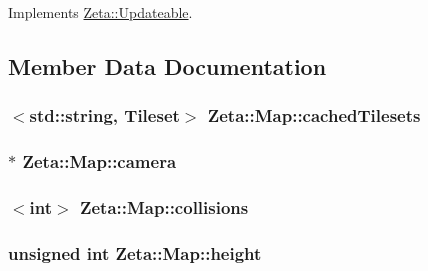 Implements \hyperlink{classZeta_1_1Updateable_af4006bfccb762454b4da08786ad93de0}{Zeta\+::\+Updateable}.



\subsection{Member Data Documentation}
\hypertarget{classZeta_1_1Map_aa4510662d56f1daac52bf382de75ad99}{
\subsubsection[{cached\+Tilesets}]{$<$std\+::string, {\bf Tileset}$>$ Zeta\+::\+Map\+::cached\+Tilesets\hspace{0.3cm}{\ttfamily [protected]}}}\label{classZeta_1_1Map_aa4510662d56f1daac52bf382de75ad99}
\hypertarget{classZeta_1_1Map_a9b9106c7c9476767a019f2a0a6a6e29b}{
\subsubsection[{camera}]{$\ast$ Zeta\+::\+Map\+::camera\hspace{0.3cm}{\ttfamily [protected]}}}\label{classZeta_1_1Map_a9b9106c7c9476767a019f2a0a6a6e29b}
\hypertarget{classZeta_1_1Map_af6cc05c67e067a4b85bd54087875589d}{
\subsubsection[{collisions}]{$<$int$>$ Zeta\+::\+Map\+::collisions\hspace{0.3cm}{\ttfamily [protected]}}}\label{classZeta_1_1Map_af6cc05c67e067a4b85bd54087875589d}
\hypertarget{classZeta_1_1Map_aa28d08e860a10888d104dd06e662d2d9}{
\subsubsection[{height}]{\setlength{\rightskip}{0pt plus 5cm}unsigned int Zeta\+::\+Map\+::height\hspace{0.3cm}{\ttfamily [protected]}}}\label{classZeta_1_1Map_aa28d08e860a10888d104dd06e662d2d9}
